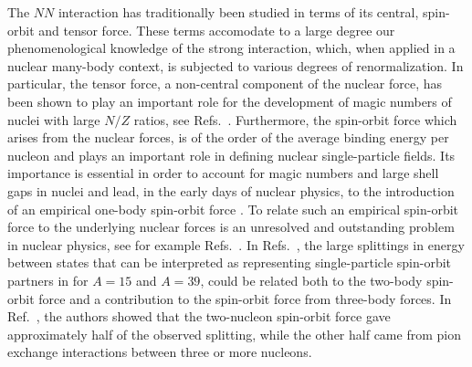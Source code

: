 \documentclass[aps,showpacs,floatfix,nofootinbib,preprintnumbers,superscriptaddress,amsmath,amssymb]{revtex4-1}
\begin{document}
The $NN$ interaction has traditionally been studied
in terms of its central, spin-orbit and tensor force.  These terms
accomodate to a large degree our phenomenological knowledge of the
strong interaction, which, when applied in a nuclear many-body
context, is subjected to various degrees of renormalization.  In
particular, the tensor force, a non-central component of the nuclear
force, has been shown to play an important role for the development of
magic numbers of nuclei with large $N/Z$ ratios, see
Refs.~\cite{otsuka2001,otsuka2005,otsuka2010b,tsunoda2011,smirnova2010}.
Furthermore, the spin-orbit force which arises from the nuclear
forces, is of the order of the average binding energy per
nucleon and plays an important role in defining nuclear
single-particle fields. Its importance is essential in order to account
for magic numbers and large shell gaps in nuclei and lead, in the
early days of nuclear physics, to the introduction of an empirical
one-body spin-orbit force \cite{mayer1949,haxel1949}. To relate such
an empirical spin-orbit force to the underlying nuclear forces is an
unresolved and outstanding problem in nuclear physics, see for example
Refs.~\cite{ando1981,burgunder2014}.  In
Refs.~\cite{ando1981,pieper1993}, the large splittings in energy
between states that can be interpreted as representing single-particle
spin-orbit partners in for $A=15$ and $A=39$, could be related both to
the two-body spin-orbit force and a contribution to the spin-orbit
force from three-body forces. In Ref.~\cite{pieper1993}, the authors
showed that the two-nucleon spin-orbit force gave approximately half
of the observed splitting, while the other half came from pion
exchange interactions between three or more nucleons.
\end{document}
